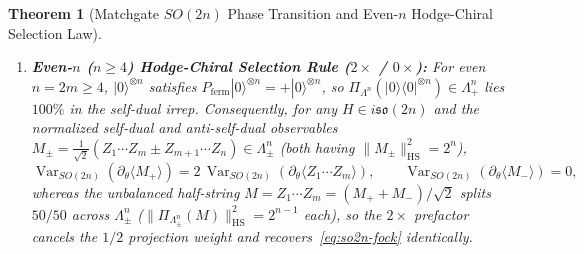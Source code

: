 \documentclass[11pt,a4paper]{article}
\newtheorem{theorem}{Theorem}[section]
\theoremstyle{definition}
\theoremstyle{remark}
\newcommand{\Var}{\operatorname{Var}}
\newcommand{\HS}{\mathrm{HS}}
\newcommand{\so}{\mathfrak{so}}
\begin{document}
\begin{theorem}[Matchgate $SO(2n)$ Phase Transition and Even-$n$ Hodge-Chiral Selection Law]
\begin{enumerate}[leftmargin=1.8em,itemsep=3pt]
\begin{itemize}[leftmargin=1.4em,itemsep=1pt]
    \item $k=4$ ($Z_1 Z_2 \notin i\so(2n)$): $\Var = \frac{24(n-2)}{n(2n-1)^2(2n-3)} = \Theta(n^{-3})$ (\emph{trainable outside $i\so(2n)$});
    \item $k=n$ ($n=2m$, $Z_1\cdots Z_m$): $\Var = \frac{n\binom{n}{n/2}}{(2n-1)\binom{2n}{n}} = \Theta(2^{-n})$ (\emph{exponential barren plateau within a circuit whose DLA $\dim\so(2n)=n(2n-1)$ is quadratic}), with exact separation ratio $\Var(k=2)/\Var(k=n) \ge \frac{4(n-1)\,2^n}{n^2(2n-1)(2n+1)}$.
  \end{itemize}
  \item \textbf{Even-$n$ ($n \ge 4$) Hodge-Chiral Selection Rule ($2\times$ / $0\times$):} For even $n=2m \ge 4$, $|0\rangle^{\otimes n}$ satisfies $P_{\mathrm{ferm}}|0\rangle^{\otimes n} = +|0\rangle^{\otimes n}$, so $\Pi_{\Lambda^n}(|0\rangle\langle 0|^{\otimes n}) \in \Lambda^n_+$ lies $100\%$ in the self-dual irrep. Consequently, for any $H \in i\so(2n)$ and the normalized self-dual and anti-self-dual observables $M_\pm = \frac{1}{\sqrt{2}}(Z_1\cdots Z_m \pm Z_{m+1}\cdots Z_n) \in \Lambda^n_\pm$ (both having $\|M_\pm\|_{\HS}^2 = 2^n$),
  \begin{equation}\label{eq:hodge-selection}
    \Var_{SO(2n)}(\partial_\theta \langle M_+\rangle) = 2\,\Var_{SO(2n)}(\partial_\theta \langle Z_1\cdots Z_m\rangle), \qquad
    \Var_{SO(2n)}(\partial_\theta \langle M_-\rangle) = 0,
  \end{equation}
  whereas the unbalanced half-string $M = Z_1\cdots Z_m = (M_+ + M_-)/\sqrt{2}$ splits $50/50$ across $\Lambda^n_\pm$ ($\|\Pi_{\Lambda^n_\pm}(M)\|_{\HS}^2 = 2^{n-1}$ each), so the $2\times$ prefactor cancels the $1/2$ projection weight and recovers~\eqref{eq:so2n-fock} identically.
\end{enumerate}
\end{theorem}
\end{document}
